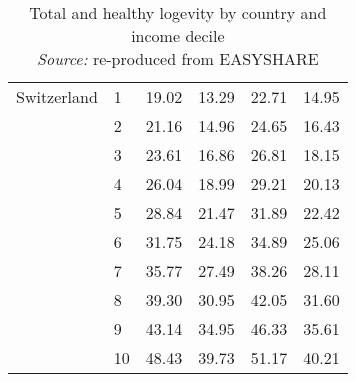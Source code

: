 \begin{table}
\begin{tabular}{llrrrr}
Switzerland & 1  &   19.02 &  13.29 &  22.71 &  14.95 \\
            & 2  &   21.16 &  14.96 &  24.65 &  16.43 \\
            & 3  &   23.61 &  16.86 &  26.81 &  18.15 \\
            & 4  &   26.04 &  18.99 &  29.21 &  20.13 \\
            & 5  &   28.84 &  21.47 &  31.89 &  22.42 \\
            & 6  &   31.75 &  24.18 &  34.89 &  25.06 \\
            & 7  &   35.77 &  27.49 &  38.26 &  28.11 \\
            & 8  &   39.30 &  30.95 &  42.05 &  31.60 \\
            & 9  &   43.14 &  34.95 &  46.33 &  35.61 \\
            & 10 &   48.43 &  39.73 &  51.17 &  40.21 \\
\bottomrule
\end{tabular}
\captionsetup{justification=centering}
\caption{Total and healthy logevity by country and income decile \\ 
\textit{Source:} re-produced from EASYSHARE }
\end{table}








